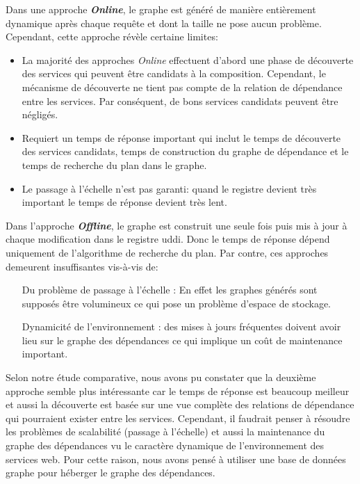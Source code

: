   Dans une approche \textbf{\textit{Online}}, le graphe est généré de
  manière entièrement dynamique après chaque requête et dont la taille
  ne pose aucun problème. Cependant, cette approche révèle certaine
  limites:

  \SpecialItem
  \begin{itemize}
  \item La majorité des approches \textit{Online} effectuent d'abord une
    phase de découverte des services qui peuvent être candidats à la
    composition. Cependant, le mécanisme de découverte ne tient pas
    compte de la relation de dépendance entre les services. Par
    conséquent, de bons services candidats peuvent être négligés.

  \item Requiert un temps de réponse important qui inclut le temps de
    découverte des services candidats, temps de construction du graphe
    de dépendance et le temps de recherche du plan dans le graphe.

  \item Le passage à l'échelle n'est pas garanti: quand le registre
    devient très important le temps de réponse devient très
    lent.\bigskip

  \end{itemize}
  \enddescription

  Dans l'approche \textbf{\textit{Offline}}, le graphe est construit une
  seule fois puis mis à jour à chaque modification dans le registre
  \acrshort{uddi}. Donc le temps de réponse dépend uniquement de
  l'algorithme de recherche du plan. Par contre, ces approches
  demeurent insuffisantes vis-à-vis de:\medskip

  \SpecialItem
  \begin{itemize}
  \item [Du problème de passage à l'échelle]: En effet les graphes
    générés sont supposés être volumineux ce qui pose un problème
    d'espace de stockage.

  \item [Dynamicité de l'environnement]: des mises à jours fréquentes
    doivent avoir lieu sur le graphe des dépendances ce qui implique un
    coût de maintenance important.\bigskip

  \end{itemize}
  \enddescription



Selon notre étude comparative, nous avons pu constater que la deuxième
approche semble plus intéressante car le temps de réponse est beaucoup
meilleur et aussi la découverte est basée sur une vue complète des
relations de dépendance qui pourraient exister entre les services.
Cependant, il faudrait penser à résoudre les problèmes de scalabilité
(passage à l'échelle) et aussi la maintenance du graphe des dépendances
vu le caractère dynamique de l'environnement des services web.  Pour
cette raison, nous avons pensé à utiliser une base de données graphe
pour héberger le graphe des dépendances.

